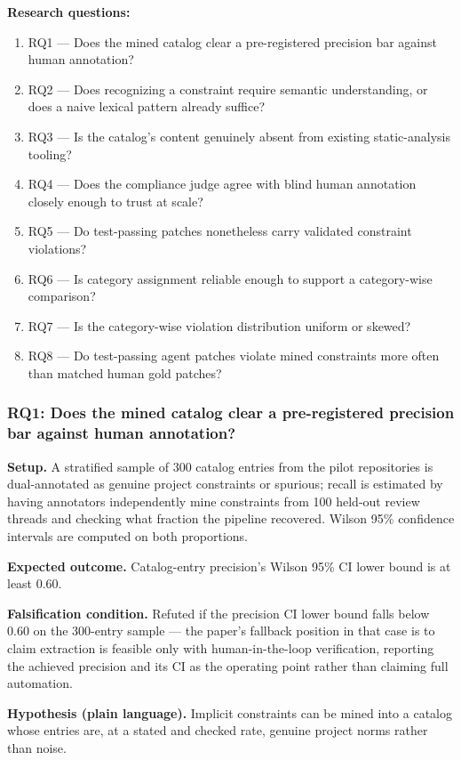 \documentclass[11pt]{article}
\begin{document}
\textbf{Research questions:}
\begin{enumerate}[leftmargin=1.6em]
\item RQ1 --- Does the mined catalog clear a pre-registered precision bar against human annotation?
\item RQ2 --- Does recognizing a constraint require semantic understanding, or does a naive lexical pattern already suffice?
\item RQ3 --- Is the catalog's content genuinely absent from existing static-analysis tooling?
\item RQ4 --- Does the compliance judge agree with blind human annotation closely enough to trust at scale?
\item RQ5 --- Do test-passing patches nonetheless carry validated constraint violations?
\item RQ6 --- Is category assignment reliable enough to support a category-wise comparison?
\item RQ7 --- Is the category-wise violation distribution uniform or skewed?
\item RQ8 --- Do test-passing agent patches violate mined constraints more often than matched human gold patches?
\end{enumerate}

\subsubsection{RQ1: Does the mined catalog clear a pre-registered precision bar against human annotation?}
\textbf{Setup.} A stratified sample of 300 catalog entries from the pilot repositories is dual-annotated as genuine project constraints or spurious; recall is estimated by having annotators independently mine constraints from 100 held-out review threads and checking what fraction the pipeline recovered. Wilson 95\% confidence intervals are computed on both proportions.

\textbf{Expected outcome.} Catalog-entry precision's Wilson 95\% CI lower bound is at least 0.60.

\textbf{Falsification condition.} Refuted if the precision CI lower bound falls below 0.60 on the 300-entry sample --- the paper's fallback position in that case is to claim extraction is feasible only with human-in-the-loop verification, reporting the achieved precision and its CI as the operating point rather than claiming full automation.

\textbf{Hypothesis (plain language).} Implicit constraints can be mined into a catalog whose entries are, at a stated and checked rate, genuine project norms rather than noise.
\end{document}
